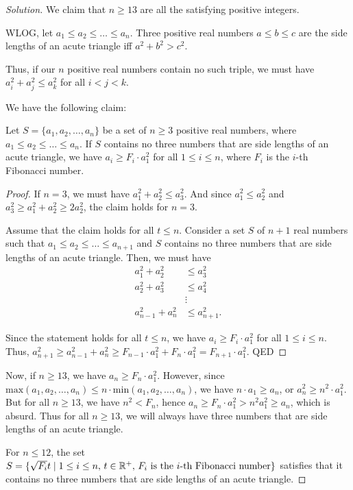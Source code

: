 \begin{proof}[Solution]
We claim that $n\ge 13$ are all the satisfying positive integers.

WLOG, let $a_1\le a_2\le\hdots\le a_n$. Three positive real numbers $a\le b \le c$ are the side lengths of an acute triangle iff $a^2+b^2>c^2$. 

Thus, if our $n$ positive real numbers contain no such triple, we must have $a_i^2 + a_j^2 \le a_k^2$ for all $i<j<k$. 

We have the following claim:

\begin{lemma}
Let $S=\{a_1, a_2, \hdots, a_n\}$ be a set of $n\ge 3$ positive real numbers, where $a_1\le a_2\le\hdots\le a_n$. If $S$ contains no three numbers that are side lengths of an acute triangle, we have $a_i\ge F_i\cdot a_1^2$ for all $1\le i\le n$, where $F_i$ is the $i$-th Fibonacci number.
\end{lemma}
\begin{proof}
If $n=3$, we must have $a_1^2+a_2^2\le a_3^2$. And since $a_1^2\le a_2^2$ and $a_3^2\ge a_1^2+a_2^2\ge 2a_2^2$, the claim holds for $n=3$.

Assume that the claim holds for all $t\le n$. Consider a set $S$ of $n+1$ real numbers such that $a_1\le a_2\le\hdots\le a_{n+1}$ and $S$ contains no three numbers that are side lengths of an acute triangle. Then, we must have
\begin{align*}
a_1^2+a_2^2&\le a_3^2\\
a_2^2+a_3^2&\le a_4^2\\		
&\vdots\\
a_{n-1}^2+a_{n}^2&\le a_{n+1}^2.
\end{align*}

Since the statement holds for all $t\le n$, we have $a_i\ge F_i\cdot a_1^2$ for all $1\le i\le n$. 
Thus, $a_{n+1}^2\ge a_{n-1}^2+a_{n}^2\ge F_{n-1}\cdot a_1^2+F_n\cdot a_1^2=F_{n+1}\cdot a_1^2$. QED
\end{proof}
Now, if $n\ge 13$, we have $a_n\ge F_n\cdot a_1^2$. However, since $\text{max}(a_1,a_2,\dots,a_n) \le n \cdot\text{min}(a_1,a_2, \dots,a_n)$, we have $n\cdot a_1\ge a_n$, or $a_n^2\ge n^2\cdot a_1^2$. But for all $n\ge 13$, we have $n^2<F_n$, hence $a_n\ge F_n \cdot a_1^2>n^2a_1^2\ge a_n$, which is absurd. Thus for all $n\ge 13$, we will always have three numbers that are side lengths of an acute triangle.

For $n\le 12$, the set $S=\{\sqrt{F_i}t\mid 1\le i\le n,\,t\in\mathbb R^+,\, F_i\text{ is the }i\text{-th Fibonacci number}\}$ satisfies that it contains no three numbers that are side lengths of an acute triangle.
\end{proof}
\pagebreak

